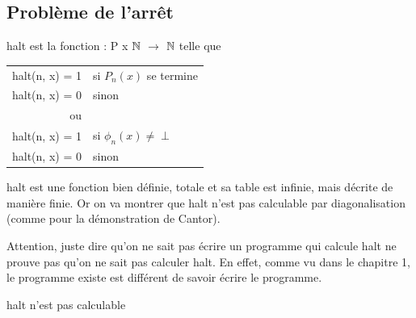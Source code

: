 
\subsection{Problème de l'arrêt}
\label{sub:probl_me_de_l_arr_t}

\begin{mydef}[halt]
	halt est la fonction : P x $\mathbb{N}$ $\rightarrow$ $\mathbb{N}$ telle que \\
	\begin{tabular}{rl}
	  halt(n, x) = 1 & si $P_n(x)$ se termine \\
	  halt(n, x) = 0 & sinon \\
	  ou &\\
	  halt(n, x) = 1 & si $\phi_n(x)\neq \perp$ \\
	  halt(n, x) = 0 & sinon \\
	\end{tabular}
\end{mydef}

\begin{myprop}
	halt est une fonction bien définie, totale et sa table est infinie, mais décrite 
	de manière finie. Or on va montrer que halt n'est pas calculable par 
	diagonalisation (comme pour la démonstration de Cantor).\\
\end{myprop}

\begin{myrem}
	Attention, juste dire qu'on ne sait pas écrire un programme qui calcule
	halt ne prouve pas qu'on ne sait pas calculer halt. En effet, comme vu
	dans le chapitre 1, le programme existe est différent de savoir écrire
	le programme.
\end{myrem}

\begin{mytheo}[halt]
	halt n'est pas calculable
\end{mytheo}

